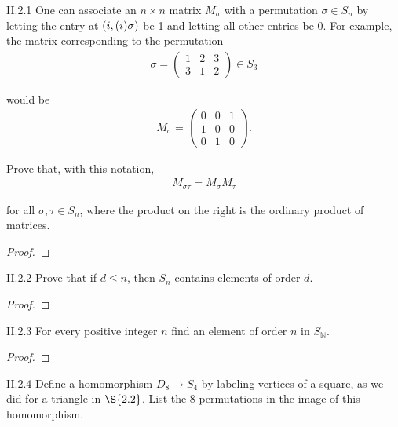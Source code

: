 \begin{exercise}{II.2.1}
	One can associate an $n\times n$ matrix $M_{\sigma}$ with a permutation $\sigma \in S_{n}$ by letting the entry at $\left({i, (i)\sigma}\right)$ be 1 and letting all other entries be 0. For example, the matrix corresponding to the permutation
	\begin{align*}
		\sigma = \begin{pmatrix}
			         1 & 2 & 3 \\
			         3 & 1 & 2
		         \end{pmatrix} \in S_{3}
	\end{align*}

    would be
    \begin{align*}
        M_{\sigma} = \begin{pmatrix}
            0 & 0 & 1 \\
            1 & 0 & 0 \\
            0 & 1 & 0
        \end{pmatrix}.
    \end{align*}

    Prove that, with this notation,
    \begin{align*}
        M_{\sigma\tau} = M_{\sigma}M_{\tau}
    \end{align*}

    for all $\sigma, \tau\in S_{n}$, where the product on the right is the ordinary product of matrices.
\end{exercise}

\begin{proof}
\end{proof}

\begin{exercise}{II.2.2}
    Prove that if $d\leq n$, then $S_{n}$ contains elements of order $d$.
\end{exercise}

\begin{proof}
\end{proof}

\begin{exercise}{II.2.3}
    For every positive integer $n$ find an element of order $n$ in $S_{\mathbb{N}}$.
\end{exercise}

\begin{proof}
\end{proof}

\begin{exercise}{II.2.4}
    Define a homomorphism $D_{8}\to S_{4}$ by labeling vertices of a square, as we did for a triangle in $\S{2.2}$. List the 8 permutations in the image of this homomorphism.
\end{exercise}


